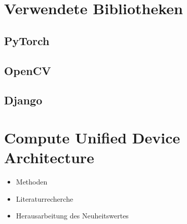 \section{Verwendete Bibliotheken}

\subsection{PyTorch}

\subsection{OpenCV}

\subsection{Django}


\section{Compute Unified Device Architecture}


\begin{itemize}
	\item Methoden
	\item Literaturrecherche
	\item Herausarbeitung des Neuheitswertes 
\end{itemize}